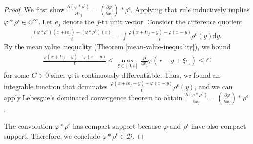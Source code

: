 \begin{proof}
    We first show \(\frac{\partial (\varphi * \rho^{\epsilon})}{\partial x_j} = \left(\frac{\partial \varphi}{\partial x_j}\right) * \rho^{\epsilon}\). Applying that rule inductively implies \(\varphi * \rho^{\epsilon} \in C^{\infty}\). Let \(e_j\) denote the \(j\)-th unit vector. Consider the difference quotient
    \begin{align*}
        \frac{(\varphi * \rho^\epsilon)(x + te_j) - (\varphi * \rho^\epsilon)(x)}{t} = \int \frac{\varphi(x+te_j - y) - \varphi(x-y)}{t}\rho^{\epsilon}(y) \mathrm{d}y.
    \end{align*}
    By the mean value inequality (Theorem \ref{mean-value-inequality}), we bound
    \begin{align*}
        \frac{\varphi (x + te_j - y) - \varphi (x-y)}{t} \leq \max_{\xi \in [0,t]}\frac{\partial}{\partial x_j}\varphi(x - y + \xi e_j) \leq C
    \end{align*}
    for some \(C > 0\) since \(\varphi\) is continuously differentiable. Thus, we found an integrable function that dominates \(\frac{\varphi(x+te_j - y) - \varphi(x-y)}{t}\rho^{\epsilon}(y)\), and we can apply Lebesgue's dominated convergence theorem to obtain \(\frac{\partial (\varphi * \rho^{\epsilon})}{\partial x_j} = \left(\frac{\partial \varphi}{\partial x_j}\right) * \rho^{\epsilon}\).

    The convolution \(\varphi * \rho^{\epsilon}\) has compact support because \(\varphi\) and \(\rho^{\epsilon}\) have also compact support. Therefore, we conclude \(\varphi * \rho^{\epsilon} \in \mathcal{D}\).


\end{proof}
